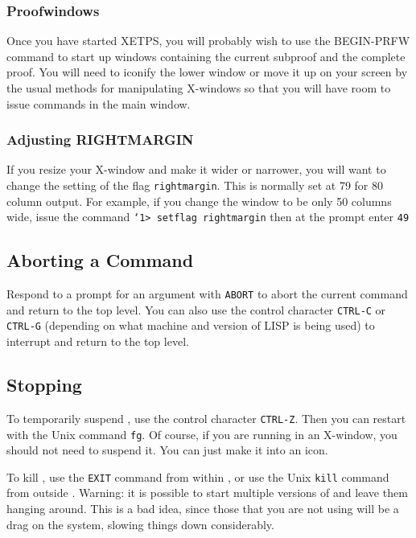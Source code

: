\documentclass{article}
\begin{document}
\subsubsection{Proofwindows}

Once you have started XETPS, you will probably wish to use the
BEGIN-PRFW command to start up windows containing the current subproof
and the complete proof.  You will need to iconify the lower window or
move it up on your screen by the usual methods for manipulating
X-windows so that you will have room to issue commands in the main
{\ETPS} window.

\subsubsection{Adjusting RIGHTMARGIN}

If you resize your {\ETPS} X-window and make it wider or narrower, you will
want to change the setting of the flag {\tt rightmargin}.  This is normally
set at 79 for 80 column output.  For example, if you change the window to be
only 50 columns wide, issue the command \newline{}
{\tt {\tt\char`\<}1> setflag rightmargin}\newline{}
then at the prompt enter\newline{}
 {\tt 49}

\subsection{Aborting a Command}

Respond to a prompt for an argument with {\tt ABORT} to abort the current
command and return to the top level.  You can also use the control character
{\tt CTRL-C} or {\tt CTRL-G} (depending on what machine and version of LISP is
being used) to interrupt {\ETPS} and return to the top level.

\subsection{Stopping {\ETPS}}

To temporarily suspend {\ETPS}, use the control character {\tt CTRL-Z}.  Then
you can restart {\ETPS} with the  Unix command {\tt fg}.  Of course, if you
are running {\ETPS} in an X-window, you should not need to suspend it. You
can just make it into an icon.

To kill {\ETPS}, use the {\tt EXIT} command from within {\ETPS}, or use
the Unix {\tt kill} command from outside {\ETPS}.
Warning:  it is possible to start
multiple versions of {\ETPS} and leave them hanging around.
This is a bad idea, since those that
you are not using will be a drag on the system, slowing things down
considerably.
\end{document}
